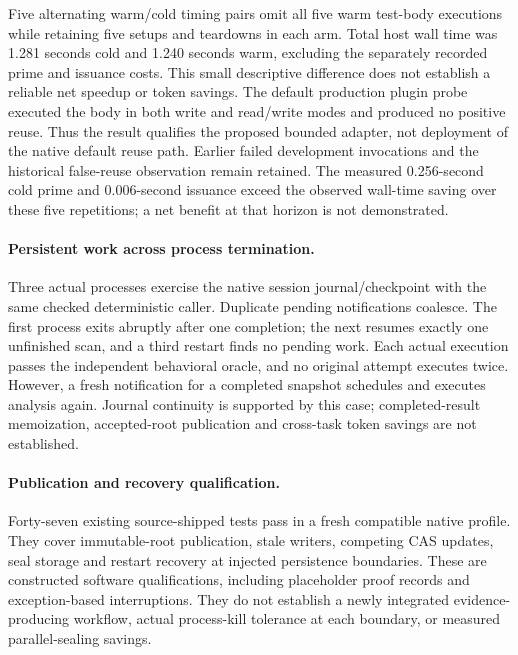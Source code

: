 Five alternating warm/cold timing pairs omit all five warm test-body executions
while retaining five setups and teardowns in each arm. Total host wall time was
1.281 seconds cold and 1.240 seconds warm, excluding the separately recorded
prime and issuance costs. This small descriptive difference does not establish
a reliable net speedup or token savings. The default production plugin probe
executed the body in both write and read/write modes and produced no positive
reuse. Thus the result qualifies the proposed bounded adapter, not deployment
of the native default reuse path. Earlier failed development invocations and
the historical false-reuse observation remain retained.
The measured 0.256-second cold prime and 0.006-second issuance exceed
the observed wall-time saving over these five repetitions; a net benefit at
that horizon is not demonstrated.

\paragraph{Persistent work across process termination.}
Three actual processes exercise the native session journal/checkpoint with
the same checked deterministic caller. Duplicate pending notifications coalesce.
The first process exits abruptly after one completion; the next resumes exactly
one unfinished scan, and a third restart finds no pending work. Each actual
execution passes the independent behavioral oracle, and no original attempt
executes twice. However, a fresh notification for a completed snapshot schedules
and executes analysis again. Journal continuity is supported by this case;
completed-result memoization, accepted-root publication and cross-task token
savings are not established.

\paragraph{Publication and recovery qualification.}
Forty-seven existing source-shipped tests pass in a fresh compatible native
profile. They cover immutable-root publication, stale writers, competing CAS
updates, seal storage and restart recovery at injected persistence boundaries.
These are constructed software qualifications, including placeholder proof
records and exception-based interruptions. They do not establish a newly
integrated evidence-producing workflow, actual process-kill tolerance at each
boundary, or measured parallel-sealing savings.

